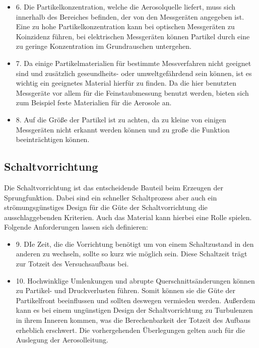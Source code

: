 \begin{itemize}
\item 6. Die Partikelkonzentration, welche die Aerosolquelle liefert, muss sich innerhalb des Bereiches befinden, der von den Messger\"{a}ten angegeben ist. Eine zu hohe Partikelkonzentration kann bei optischen Messger\"{a}ten zu Koinzidenz f\"{u}hren, bei elektrischen Messger\"{a}ten k\"{o}nnen Partikel durch eine zu geringe Konzentration im Grundrauschen untergehen.

\item 7. Da einige Partikelmaterialien f\"{u}r bestimmte Messverfahren nicht geeignet sind und zus\"{a}tzlich geseundheits- oder umweltgef\"{a}hrdend sein k\"{o}nnen, ist es wichtig ein geeignetes Material hierf\"{u}r zu finden. Da die hier benutzten Messgeräte vor allem für die Feinstaubmessung benutzt werden, bieten sich zum Beispiel feste Materialien für die Aerosole an.

\item 8. Auf die Gr\"{o}{\ss}e der Partikel ist zu achten, da zu kleine von einigen Messger\"{a}ten nicht erkannt werden k\"{o}nnen und zu gro{\ss}e die Funktion beeintr\"{a}chtigen k\"{o}nnen.
\end{itemize}

\subsection{Schaltvorrichtung}
Die Schaltvorrichtung ist das entscheidende Bauteil beim Erzeugen der Sprungfunktion. Dabei sind ein schneller Schaltprozess aber auch ein str\"{o}mungsg\"{u}nstiges Design für die G\"{u}te der Schaltvorrichtung die ausschlaggebenden Kriterien. Auch das Material kann hierbei eine Rolle spielen. Folgende Anforderungen lassen sich definieren:

\begin{itemize}
	\item 9. DIe Zeit, die die Vorrichtung ben\"{o}tigt um von einem Schaltzustand in den anderen zu wechseln, sollte so kurz wie m\"{o}glich sein. Diese Schaltzeit tr\"{a}gt zur Totzeit des Versuchsaufbaus bei. 
	
	\item 10. Hochwinklige Umlenkungen und abrupte Querschnitts\"{a}nderungen k\"{o}nnen zu Partikel- und Druckverlusten f\"{u}hren. Somit k\"{o}nnen sie die G\"{u}te der Partikelfront beeinflussen und sollten deswegen vermieden werden. Au{\ss}erdem kann es bei einem ung\"{u}nstigen Design der Schaltvorrichtung zu Turbulenzen in ihrem Inneren kommen, was die Berechenbarkeit der Totzeit des Aufbaus erheblich erschwert. Die vorhergehenden \"{U}berlegungen gelten auch für die Auslegung der Aerosolleitung.
\end{itemize}

